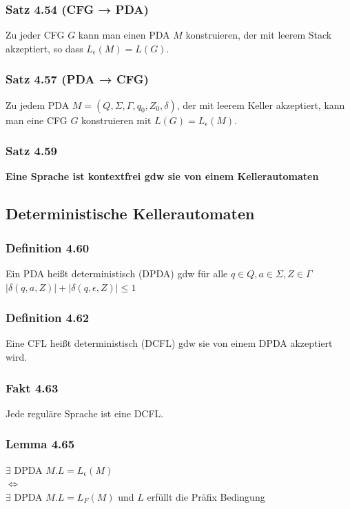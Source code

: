 \documentclass[11pt]{article}
\begin{document}
\subsubsection{Satz 4.54 (CFG → PDA)}
\label{sec:org17954b1}
Zu jeder CFG \(G\) kann man einen PDA \(M\) konstruieren, der mit leerem Stack akzeptiert, so dass \(L_\epsilon(M) = L(G)\).
\subsubsection{Satz 4.57 (PDA → CFG)}
\label{sec:org8a37704}
Zu jedem PDA \(M = (Q, \Sigma, \Gamma, q_0, Z_0, \delta)\), der mit leerem Keller
akzeptiert, kann man eine CFG \(G\) konstruieren mit \(L(G) = L_\epsilon(M)\).
\subsubsection{Satz 4.59}
\label{sec:org2f62879}
\textbf{Eine Sprache ist kontextfrei gdw sie von einem Kellerautomaten}

\subsection{Deterministische Kellerautomaten}
\label{sec:org7d6748c}
\subsubsection{Definition 4.60}
\label{sec:org38e63a9}
Ein PDA heißt deterministisch (DPDA) gdw für alle \(q \in Q, a \in \Sigma, Z \in \Gamma\) \\
\(|\delta(q, a, Z)| + |\delta(q, \epsilon, Z)| \leq 1\)
\subsubsection{Definition 4.62}
\label{sec:orgaffdd0a}
Eine CFL heißt deterministisch (DCFL) gdw sie von einem DPDA
akzeptiert wird.
\subsubsection{Fakt 4.63}
\label{sec:org92c3bdb}
Jede reguläre Sprache ist eine DCFL.
\subsubsection{Lemma 4.65}
\label{sec:org29d2524}
\(\exists\) DPDA \(M. L = L_\epsilon(M)\) \\
\(\iff\) \\
\(\exists\) DPDA \(M. L = L_F(M)\) und \(L\) erfüllt die Präfix Bedingung
\end{document}
